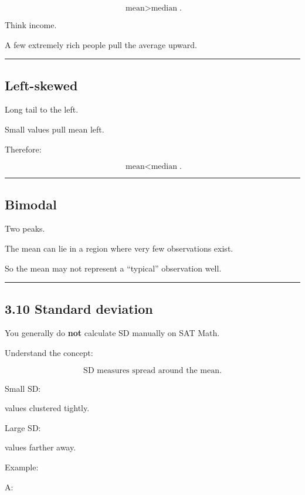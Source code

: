\documentclass[
]{article}
\begin{document}
\[
\boxed{\text{mean}>\text{median}}.
\]

Think income.

A few extremely rich people pull the average upward.

\begin{center}\rule{0.5\linewidth}{0.5pt}\end{center}

\subsection{Left-skewed}\label{left-skewed}

Long tail to the left.

Small values pull mean left.

Therefore:

\[
\boxed{\text{mean}<\text{median}}.
\]

\begin{center}\rule{0.5\linewidth}{0.5pt}\end{center}

\subsection{Bimodal}\label{bimodal}

Two peaks.

The mean can lie in a region where very few observations exist.

So the mean may not represent a ``typical'' observation well.

\begin{center}\rule{0.5\linewidth}{0.5pt}\end{center}

\subsection{3.10 Standard deviation}\label{standard-deviation}

You generally do \textbf{not} calculate SD manually on SAT Math.

Understand the concept:

\[
\boxed{\text{SD measures spread around the mean}}.
\]

Small SD:

values clustered tightly.

Large SD:

values farther away.

Example:

A:
\end{document}
